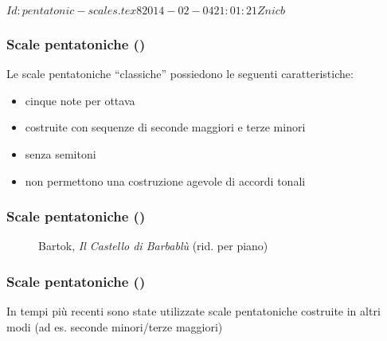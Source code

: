 %
%
\svnInfo $Id: pentatonic-scales.tex 8 2014-02-04 21:01:21Z nicb $

\setcounter{ms}{0}
\begin{frame}
    \frametitle{Scale pentatoniche ()}

    Le scale pentatoniche ``classiche''
    possiedono le seguenti caratteristiche:

    \begin{itemize}
        \item cinque note per ottava
        \item costruite con sequenze di seconde maggiori e terze minori
        \item senza semitoni
        \item non permettono una costruzione agevole di accordi tonali
    \end{itemize}

\end{frame}

\begin{frame}
    \frametitle{Scale pentatoniche ()}

    \begin{center}
        \begin{figure}
            \caption{Bartok, \emph{Il Castello di Barbabl\`u} (rid. per piano)}
        \end{figure}
    \end{center}

\end{frame}

\begin{frame}
    \frametitle{Scale pentatoniche ()}

    In tempi pi\`u recenti sono state utilizzate scale pentatoniche
    costruite in altri modi
    (ad es. seconde minori/terze maggiori)

\end{frame}
